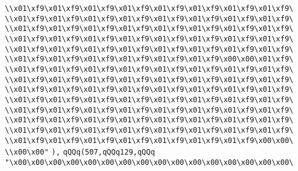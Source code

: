 \verb|\\x01\xf9\x01\xf9\x01\xf9\x01\xf9\x01\xf9\x01\xf9\x01\xf9\x01\xf9\|\newline
\verb|\\x01\xf9\x01\xf9\x01\xf9\x01\xf9\x01\xf9\x01\xf9\x01\xf9\x01\xf9\|\newline
\verb|\\x01\xf9\x01\xf9\x01\xf9\x01\xf9\x01\xf9\x01\xf9\x01\xf9\x01\xf9\|\newline
\verb|\\x01\xf9\x01\xf9\x01\xf9\x01\xf9\x01\xf9\x01\xf9\x01\xf9\x01\xf9\|\newline
\verb|\\x01\xf9\x01\xf9\x01\xf9\x01\xf9\x01\xf9\x01\xf9\x01\xf9\x01\xf9\|\newline
\verb|\\x01\xf9\x01\xf9\x01\xf9\x01\xf9\x01\xf9\x01\xf9\x00\x00\x01\xf9\|\newline
\verb|\\x01\xf9\x01\xf9\x01\xf9\x01\xf9\x01\xf9\x01\xf9\x01\xf9\x01\xf9\|\newline
\verb|\\x01\xf9\x01\xf9\x01\xf9\x01\xf9\x01\xf9\x01\xf9\x01\xf9\x01\xf9\|\newline
\verb|\\x01\xf9\x01\xf9\x01\xf9\x01\xf9\x01\xf9\x01\xf9\x01\xf9\x01\xf9\|\newline
\verb|\\x01\xf9\x01\xf9\x01\xf9\x01\xf9\x01\xf9\x01\xf9\x01\xf9\x01\xf9\|\newline
\verb|\\x01\xf9\x01\xf9\x01\xf9\x01\xf9\x01\xf9\x01\xf9\x01\xf9\x01\xf9\|\newline
\verb|\\x01\xf9\x01\xf9\x01\xf9\x01\xf9\x01\xf9\x01\xf9\x01\xf9\x01\xf9\|\newline
\verb|\\x01\xf9\x01\xf9\x01\xf9\x01\xf9\x01\xf9\x01\xf9\x01\xf9\x01\xf9\|\newline
\verb|\\x01\xf9\x01\xf9\x01\xf9\x01\xf9\x01\xf9\x01\xf9\x01\xf9\x00\x00\|\newline
\verb|\\x00\x00"|\newline
\verb|),|\newline
\verb|qQQq(507,qQQq129,qQQq|\newline
\verb|"\x00\x00\x00\x00\x00\x00\x00\x00\x00\x00\x00\x00\x00\x00\x00\x00\|\newline
